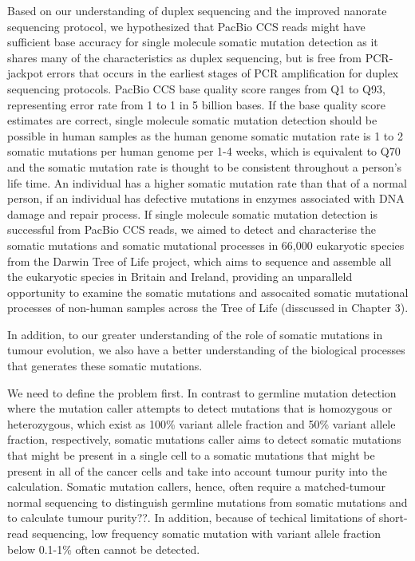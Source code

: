 Based on our understanding of duplex sequencing and the improved nanorate sequencing protocol, we hypothesized that PacBio CCS reads might have sufficient base accuracy for single molecule somatic mutation detection as it shares many of the characteristics as duplex sequencing, but is free from PCR-jackpot errors that occurs in the earliest stages of PCR amplification for duplex sequencing protocols. PacBio CCS base quality score ranges from Q1 to Q93, representing error rate from 1 to 1 in 5 billion bases. If the base quality score estimates are correct, single molecule somatic mutation detection should be possible in human samples as the human genome somatic mutation rate is 1 to 2 somatic mutations per human genome per 1-4 weeks, which is equivalent to Q70 and the somatic mutation rate is thought to be consistent throughout a person's life time. An individual has a higher somatic mutation rate than that of a normal person, if an individual has defective mutations in enzymes associated with DNA damage and repair process. If single molecule somatic mutation detection is successful from PacBio CCS reads, we aimed to detect and characterise the somatic mutations and somatic mutational processes in 66,000 eukaryotic species from the Darwin Tree of Life project, which aims to sequence and assemble all the eukaryotic species in Britain and Ireland, providing an unparalleld opportunity to examine the somatic mutations and assocaited somatic mutational processes of non-human samples across the Tree of Life (disscussed in Chapter 3). 

In addition, to our greater understanding of the role of somatic mutations in tumour evolution, we also have a better understanding of the biological processes that generates these somatic mutations.


We need to define the problem first. In contrast to germline mutation detection where the mutation caller attempts to detect mutations that is homozygous or heterozygous, which exist as 100\% variant allele fraction and 50\% variant allele fraction, respectively, somatic mutations caller aims to detect somatic mutations that might be present in a single cell to a somatic mutations that might be present in all of the cancer cells and take into account tumour purity into the calculation. Somatic mutation callers, hence, often require a matched-tumour normal sequencing to distinguish germline mutations from somatic mutations and to calculate tumour purity??. In addition, because of techical limitations of short-read sequencing, low frequency somatic mutation with variant allele fraction below 0.1-1\% often cannot be detected. 


